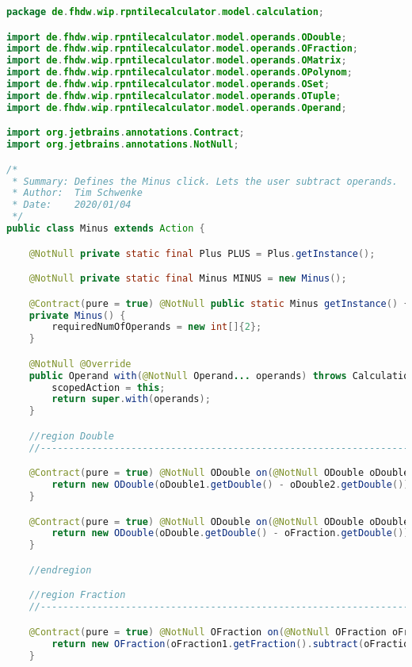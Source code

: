 \begin{lstlisting}[caption=Minus (Schwenke),label=list:Minus,language=Java]
package de.fhdw.wip.rpntilecalculator.model.calculation;

import de.fhdw.wip.rpntilecalculator.model.operands.ODouble;
import de.fhdw.wip.rpntilecalculator.model.operands.OFraction;
import de.fhdw.wip.rpntilecalculator.model.operands.OMatrix;
import de.fhdw.wip.rpntilecalculator.model.operands.OPolynom;
import de.fhdw.wip.rpntilecalculator.model.operands.OSet;
import de.fhdw.wip.rpntilecalculator.model.operands.OTuple;
import de.fhdw.wip.rpntilecalculator.model.operands.Operand;

import org.jetbrains.annotations.Contract;
import org.jetbrains.annotations.NotNull;

/*
 * Summary: Defines the Minus click. Lets the user subtract operands.
 * Author:  Tim Schwenke
 * Date:    2020/01/04
 */
public class Minus extends Action {

    @NotNull private static final Plus PLUS = Plus.getInstance();

    @NotNull private static final Minus MINUS = new Minus();

    @Contract(pure = true) @NotNull public static Minus getInstance() { return MINUS; }
    private Minus() {
        requiredNumOfOperands = new int[]{2};
    }

    @NotNull @Override
    public Operand with(@NotNull Operand... operands) throws CalculationException {
        scopedAction = this;
        return super.with(operands);
    }

    //region Double
    //------------------------------------------------------------------------------------

    @Contract(pure = true) @NotNull ODouble on(@NotNull ODouble oDouble1, @NotNull ODouble oDouble2) {
        return new ODouble(oDouble1.getDouble() - oDouble2.getDouble());
    }

    @Contract(pure = true) @NotNull ODouble on(@NotNull ODouble oDouble, @NotNull OFraction oFraction) {
        return new ODouble(oDouble.getDouble() - oFraction.getDouble());
    }

    //endregion

    //region Fraction
    //------------------------------------------------------------------------------------

    @Contract(pure = true) @NotNull OFraction on(@NotNull OFraction oFraction1, @NotNull OFraction oFraction2) {
        return new OFraction(oFraction1.getFraction().subtract(oFraction2.getFraction()));
    }


\end{lstlisting}
